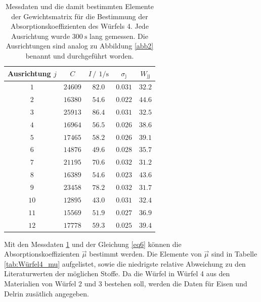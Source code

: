 \FloatBarrier
\begin{table}
    \centering
    \caption{Messdaten und die damit bestimmten Elemente der Gewichtsmatrix für die Bestimmung der Absorptionskoeffizienten des Würfels 4. Jede Ausrichtung wurde $\SI{300}{\second}$ lang gemessen. Die Ausrichtungen sind analog zu Abbildung \ref{abb2} benannt und durchgeführt worden. }
    \label{tab:Messdaten_Würfel4}
    \begin{tabular}{c c c c c}
        \toprule
        Ausrichtung $j$&$C$&$I\,/\,\SI{}{1\per\second}$&$\sigma_{\text{j}}$&$W_{\text{jj}}$\\
        \midrule
        $\num{1}$&$\num{24609}$&$\num{82.0}$ &$\num{0.031}$&$\num{32.2}$\\
        $\num{2}$&$\num{16380}$&$\num{54.6}$ &$\num{0.022}$&$\num{44.6}$\\
        $\num{3}$&$\num{25913}$&$\num{86.4}$ &$\num{0.031}$&$\num{32.5}$\\
        $\num{4}$&$\num{16964}$&$\num{56.5}$ &$\num{0.026}$&$\num{38.6}$\\
        $\num{5}$&$\num{17465}$&$\num{58.2}$ &$\num{0.026}$&$\num{39.1}$\\
        $\num{6}$&$\num{14876}$&$\num{49.6}$ &$\num{0.028}$&$\num{35.7}$\\
        $\num{7}$&$\num{21195}$&$\num{70.6}$ &$\num{0.032}$&$\num{31.2}$\\
        $\num{8}$&$\num{16389}$&$\num{54.6}$ &$\num{0.023}$&$\num{43.6}$\\
        $\num{9}$&$\num{23458}$&$\num{78.2}$ &$\num{0.032}$&$\num{31.7}$\\
        $\num{10}$&$\num{12895}$&$\num{43.0}$&$\num{0.031}$&$\num{32.4}$\\
        $\num{11}$&$\num{15569}$&$\num{51.9}$&$\num{0.027}$&$\num{36.9}$\\
        $\num{12}$&$\num{17778}$&$\num{59.3}$&$\num{0.025}$&$\num{39.4}$\\
        \bottomrule
    \end{tabular}
\end{table}
\FloatBarrier

Mit den Messdaten \ref{tab:Messdaten_Würfel4} und der Gleichung \ref{eq6} können die 
Absorptionskoeffizienten $\vec{\mu}$ bestimmt werden. Die Elemente von $\vec{\mu}$ sind in Tabelle \ref{tab:Würfel4_mu} 
aufgelistet, sowie die niedrigste relative Abweichung zu den Literaturwerten der möglichen Stoffe. Da die 
Würfel in Würfel 4 aus den Materialien von Würfel 2 und 3 bestehen soll, werden die Daten für Eisen und Delrin zusätlich angegeben.

